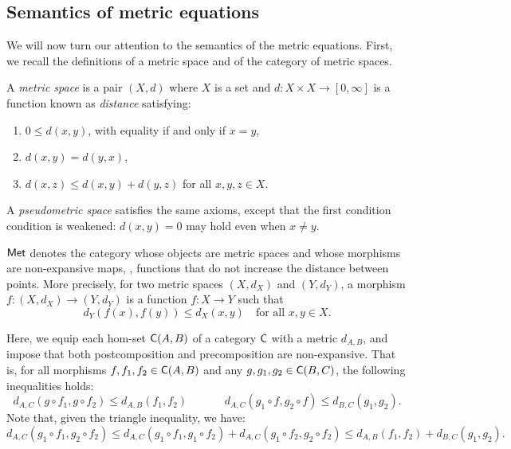 \subsection{Semantics of metric equations} \label{subsec:semantics_metric}
 We will now turn our attention to the semantics of the metric equations. First, we recall the definitions of a metric space and of the category of metric spaces.

 \begin{definition} \label{def:metric_space}
    A \emph{metric space} is a pair $(X, d)$ where $X$ is a set and $d: X \times X \to [0, \infty]$ is a function known as \emph{distance} satisfying:
    \begin{enumerate}
        \item $0 \leq d(x, y)$, with equality if and only if $x = y$,
        \item $d(x, y) = d(y, x)$,
        \item $d(x, z) \leq d(x, y) + d(y, z)$ for all $x, y, z \in X$.
    \end{enumerate}
    A \emph{pseudometric space} satisfies the same axioms, except that the first condition condition is weakened: \(d(x, y) = 0\) may hold even when \(x \neq y\).
  \end{definition}

  \begin{definition}
    $\mathsf{Met}$ denotes the category whose objects are metric spaces and whose morphisms are non-expansive maps, \ie, functions that do not increase the distance between points. More precisely, for two metric spaces $(X, d_X)$ and $(Y, d_Y)$, a morphism $f: (X, d_X) \to (Y, d_Y)$ is a function $f: X \to Y$ such that
$$
d_Y(f(x), f(y)) \leq d_X(x, y) \quad \text{for all } x, y \in X.
$$
  \end{definition}
 
 Here, we equip each hom-set $\mathsf{C}(A, B)$ of a category $\mathsf{C}$ with a metric $d_{A,B}$, and impose that both postcomposition and precomposition are non-expansive. That is, for all morphisms $f,f_1, f_2 \in \mathsf{C}(A, B)$ and any $g, g_1, g_2 \in \mathsf{C}(B, C)$, the following inequalities holds:
$$
d_{A,C}(g \circ f_1, g \circ f_2) \leq d_{A,B}(f_1, f_2) \hspace{40pt} d_{A,C}(g_1 \circ f, g_2 \circ f) \leq d_{B,C}(g_1, g_2).
$$
Note that, given the triangle inequality, we have:
\begin{equation*}
  d_{A,C}(g_1 \circ f_1, g_2 \circ f_2) \leq  d_{A,C}(g_1 \circ f_1, g_1 \circ f_2) + d_{A,C}(g_1 \circ f_2, g_2 \circ f_2) \leq  d_{A,B}(f_1, f_2) +   d_{B,C}(g_1, g_2).
\end{equation*}


